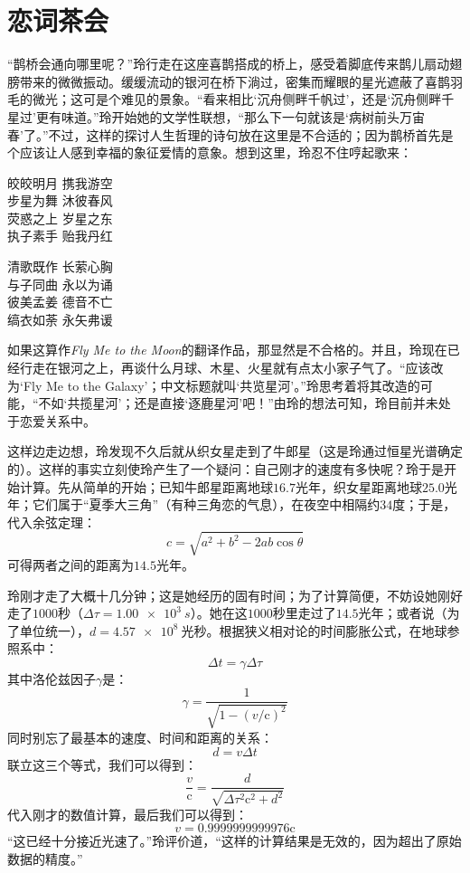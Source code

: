 \chapter{恋词茶会}

“鹊桥会通向哪里呢？”玲行走在这座喜鹊搭成的桥上，感受着脚底传来鹊儿扇动翅膀带来的微微振动。缓缓流动的银河在桥下淌过，密集而耀眼的星光遮蔽了喜鹊羽毛的微光；这可是个难见的景象。“看来相比‘沉舟侧畔千帆过’，还是‘沉舟侧畔千星过’更有味道。”玲开始她的文学性联想，“那么下一句就该是‘病树前头万宙春’了。”不过，这样的探讨人生哲理的诗句放在这里是不合适的；因为鹊桥首先是个应该让人感到幸福的象征爱情的意象。想到这里，玲忍不住哼起歌来：
\begin{song}
皎皎明月 携我游空\\
步星为舞 沐彼春风\\
荧惑之上 岁星之东\\
执子素手 贻我丹红\par
\halfline%
清歌既作 长萦心胸\\
与子同曲 永以为诵\\
彼美孟姜 德音不亡\\
缟衣如荼 永矢弗谖
\end{song}

如果这算作\textit{Fly Me to the Moon}的翻译作品，那显然是不合格的。并且，玲现在已经行走在银河之上，再谈什么月球、木星、火星就有点太小家子气了。“应该改为‘Fly Me to the Galaxy’；中文标题就叫‘共览星河’。”玲思考着将其改造的可能，“不如‘共揽星河’；还是直接‘逐鹿星河’吧！”由玲的想法可知，玲目前并未处于恋爱关系中。

这样边走边想，玲发现不久后就从织女星走到了牛郎星（这是玲通过恒星光谱确定的）。这样的事实立刻使玲产生了一个疑问：自己刚才的速度有多快呢？玲于是开始计算。先从简单的开始；已知牛郎星距离地球\(16.7\)光年，织女星距离地球\(25.0\)光年；它们属于“夏季大三角”（有种三角恋的气息），在夜空中相隔约\(34\)度；于是，代入余弦定理：
\[
c = \sqrt{a^2 + b^2 - 2ab\cos\theta}
\]
可得两者之间的距离为\(14.5\)光年。

玲刚才走了大概十几分钟；这是她经历的固有时间；为了计算简便，不妨设她刚好走了\(1000\)秒（\(\Delta\tau = \qty{1.00e3}{s}\)）。她在这\(1000\)秒里走过了\(14.5\)光年；或者说（为了单位统一），\(d=\qty{4.57e8}{光秒}\)。根据狭义相对论的时间膨胀公式，在地球参照系中：
\[
\Delta t = \gamma \Delta\tau
\]
其中洛伦兹因子\(\gamma\)是：
\[
\gamma = \frac{1}{\sqrt{1 - (v/\mathrm{c})^2}}
\]
同时别忘了最基本的速度、时间和距离的关系：
\[
d = v \Delta t
\]
联立这三个等式，我们可以得到：
\[
\frac{v}{\mathrm{c}} = \frac{d}{\sqrt{\Delta\tau^2 \mathrm{c}^2 + d^2}}
\]
代入刚才的数值计算，最后我们可以得到：
\[
v = 0.9999999999976\mathrm{c}
\]
“这已经十分接近光速了。”玲评价道，“这样的计算结果是无效的，因为超出了原始数据的精度。”

